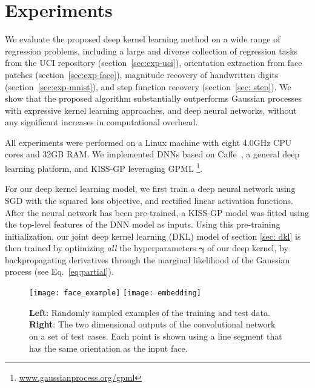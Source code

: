 \documentclass[twoside,11pt]{article}
\newcommand{\mbf}[1]{{\boldsymbol{\mathbf{#1}}}}
\renewcommand{\bm}{\mbf}
\begin{document}
\section{Experiments}
\label{sec: experiments}


We evaluate the proposed deep kernel learning method on a wide range of regression problems, including a large and diverse collection of regression tasks from the UCI repository (section~\ref{sec:exp-uci}), orientation extraction from face patches (section~\ref{sec:exp-face}), magnitude recovery of handwritten digits (section~\ref{sec:exp-mnist}), and step function recovery (section~\ref{sec: step}).   We show that the proposed algorithm substantially outperforms Gaussian processes with expressive kernel learning approaches, and deep neural networks, without any significant increases in computational overhead.

All experiments were performed on a Linux machine with eight 4.0GHz CPU cores
and 32GB RAM. We implemented DNNs
based on Caffe~\citep{jia2014caffe}, a general deep learning platform, 
and KISS-GP \citep{wilsonnickisch2015,wdn2015} leveraging GPML \citep{rasmussen10gpml} \footnote{\url{www.gaussianprocess.org/gpml}}.

For our deep kernel learning model, we first train a deep neural network using SGD with the squared loss objective,
and rectified linear activation functions.
After the neural network has been pre-trained, a KISS-GP model was fitted using the top-level features of
the DNN model as inputs. Using this pre-training initialization, our joint deep kernel learning (DKL) model of section \ref{sec: dkl} is then trained by optimizing \emph{all} the hyperparameters
$\bm{\gamma}$ of our
deep kernel, by backpropagating derivatives through the marginal likelihood of the Gaussian process (see Eq.~\ref{eq:partial}).

\begin{figure*}[t]
\hspace{0.3in}
  \subfigure
  {\texttt{[image: face\_example]}}
\hspace{0.5in}
  \subfigure
  {\texttt{[image: embedding]}}
  \caption{{\bf Left}: \small Randomly sampled examples of the training and test data.
  {\bf Right}: The two dimensional outputs of the convolutional network on a set of test cases. Each point is shown using a line segment that has the same orientation as the input face.}
\label{fig:face-fea}
\end{figure*}
\end{document}
